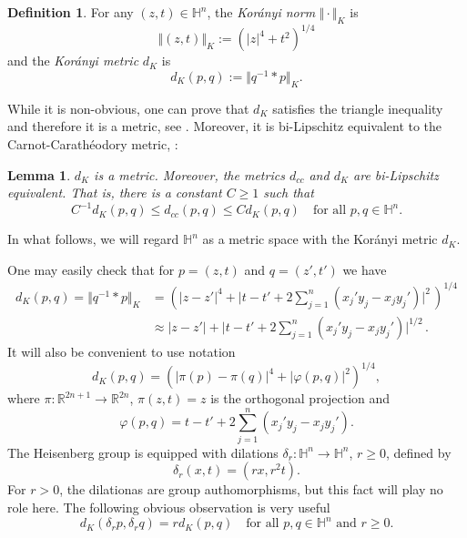 \documentclass[intlimits,12pt,reqno]{amsart}
\newcommand{\bbbh}{\mathbb H}
\newcommand{\R}{\mathbb R}
\numberwithin{equation}{section}
\newtheorem{lemma}[theorem]{Lemma}
\theoremstyle{definition}
\newtheorem{definition}[theorem]{Definition}
\begin{document}
\begin{definition}
For any $(z,t) \in \bbbh^n$, the \emph{Kor\'{a}nyi norm} $\Vert \cdot \Vert_K$ is
$$
\Vert (z,t) \Vert_K := (|z|^4+t^2)^{1/4}
$$
and the \emph{Kor\'{a}nyi metric} $d_K$ is
$$
d_K(p,q) := \Vert q^{-1} * p \Vert_K.
$$
\end{definition}
While it is non-obvious, one can prove that 
$d_K$ satisfies the triangle inequality and therefore it is a metric, see \cite[p.~320]{KR}.
Moreover, it is bi-Lipschitz equivalent to the Carnot-Carath\'eodory metric,  
\cite[Section~2.1]{CDPT}:
\begin{lemma}
\label{T41}
$d_K$ is a metric. Moreover, the metrics
$d_{cc}$ and $d_K$ are bi-Lipschitz equivalent.
That is, there is a constant $C \geq 1$ such that
$$
C^{-1}d_K(p,q) \leq d_{cc}(p,q) \leq Cd_K(p,q) 
\quad 
\text{for all $p,q\in \bbbh^n$.}
$$
\end{lemma}
In what follows, we will regard $\bbbh^n$ as a metric space with the Kor\'anyi metric $d_K$. 

One may easily check that for $p=(z,t)$ and $q=(z',t')$ we have
\begin{equation}
\begin{split}
\label{eq28}
d_K(p,q) = \Vert q^{-1}*p \Vert_K &= \left( |z-z'|^4 + \Bigg|t-t'+2\sum_{j=1}^n (x_j'y_j - x_jy_j')\Bigg|^2\, \right)^{1/4}\\
&\approx |z-z'|+\Bigg|t-t'+2\sum_{j=1}^n (x_j'y_j - x_jy_j')\Bigg|^{1/2}\, .
\end{split}
\end{equation}
It will also be convenient to use notation
\begin{equation}
\label{eq32}
d_K(p,q)=(|\pi(p)-\pi(q)|^4+|\varphi(p,q)|^2)^{1/4},
\end{equation}
where $\pi:\R^{2n+1}\to\R^{2n}$, $\pi(z,t)=z$ is the orthogonal projection and
\begin{equation}
\label{eq42}
\varphi(p,q)=t-t'+2\sum_{j=1}^n (x_j'y_j - x_jy_j').
\end{equation}
The Heisenberg group is equipped with dilations $\delta_r:\bbbh^n\to\bbbh^n$, $r\geq 0$, defined by
\begin{equation}
\label{eq147}
\delta_r(x,t)=(rx,r^2t).
\end{equation}
For $r>0$, the dilationas are group authomorphisms, but this fact will play no role here.
The following obvious observation is very useful
\begin{equation}
\label{eq142}
d_K(\delta_r p,\delta_r q)=rd_K(p,q)
\quad
\text{for all } p,q\in\bbbh^n \text{ and } r\geq 0.
\end{equation}
\end{document}

